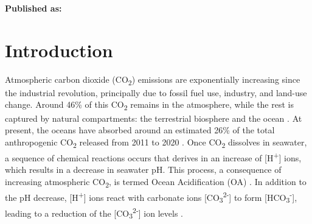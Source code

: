 




\textbf{Published as:}

\vspace{0.5cm}


\newpage
\section{Introduction}

Atmospheric carbon dioxide (CO\textsubscript{2}) emissions are
exponentially increasing since the industrial revolution, principally due to
fossil fuel use, industry, and land-use change. Around 46\% of this
CO\textsubscript{2} remains in the atmosphere, while the rest is captured by
natural compartments: the terrestrial biosphere and the ocean
\cite{Friedlingstein2021}.  At present, the oceans have absorbed around
an estimated 26\% of the total anthropogenic CO\textsubscript{2} released from
2011 to 2020 \cite{Friedlingstein2021}. Once CO\textsubscript{2} dissolves in
seawater, a sequence of chemical reactions occurs that derives in an increase
of [H\textsuperscript{+}] ions, which results in a decrease in seawater pH.
This process, a consequence of increasing atmospheric CO\textsubscript{2}, is
termed Ocean Acidification (OA) \cite{caldeira2003anthropogenic}. In addition
to the pH decrease, [H\textsuperscript{+}] ions react with carbonate ions
    [CO\textsubscript{3}\textsuperscript{2-}] to form
    [HCO\textsubscript{3}\textsuperscript{-}], leading to a reduction of the
    [CO\textsubscript{3}\textsuperscript{2-}] ion levels \cite{doney2009ocean}.

